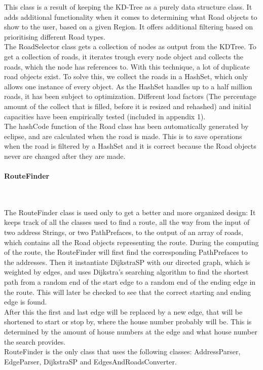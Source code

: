 \documentclass[a4paper,10pt,titlepage]{article}
\begin{document}
This class is a result of keeping the KD-Tree as a purely data structure class. It adds additional functionality when it comes to determining what Road objects to show to the user, based on a given Region. It offers additional filtering based on prioritising different Road types.\\
The RoadSelector class gets a collection of nodes as output from the KDTree. To get a collection of roads, it iterates trough every node object and collects the roads, which the node has references to. With this technique, a lot of duplicate road objects exist. To solve this, we collect the roads in a HashSet, which only allows one instance of every object. As the HashSet handles up to a half million roads, it has been subject to optimization. Different load factors (The percentage amount of the collect that is filled, before it is resized and rehashed) and initial capacities have been empirically tested (included in appendix 1).\\
The hashCode function of the Road class has been automatically generated by eclipse, and are calculated when the road is made. This is to save operations when the road is filtered by a HashSet and it is correct because the Road objects never are changed after they are made.
				
				\paragraph{RouteFinder}\mbox{}\
				
The RouteFinder class is used only to get a better and more organized design: It keeps track of all the classes used to find a route, all the way from the input of two address Strings, or two PathPrefaces, to the output of an array of roads, which contains all the Road objects representing the route. During the computing of the route, the RouteFinder will first find the corresponding PathPrefaces to the addresses. Then it instantiate DijkstraSP with our directed graph, which is weighted by edges, and uses Dijkstra’s searching algorithm to find the shortest path from a random end of the start edge to a random end of the ending edge in the route. This will later be checked to see that the correct starting and ending edge is found.\\
After this the first and last edge will be replaced by a new edge, that will be shortened to start or stop by, where the house number probably will be. This is determined by the amount of house numbers at the edge and what house number the search provides.\\
RouteFinder is the only class that uses the following classes: AddressParser,  EdgeParser, DijkstraSP and EdgesAndRoadsConverter.\\
\end{document}
